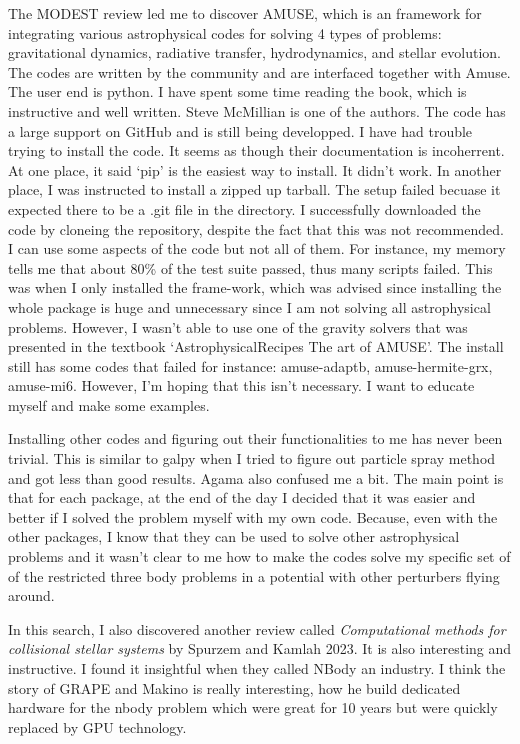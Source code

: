    The MODEST review led me to discover AMUSE, which is an framework for integrating various astrophysical codes for solving 4 types of problems: gravitational dynamics, radiative transfer, hydrodynamics, and stellar evolution. The codes are written by the community and are interfaced together with Amuse. The user end is python. I have spent some time reading the book, which is instructive and well written. Steve McMillian is one of the authors. The code has a large support on GitHub and is still being developped. I have had trouble trying to install the code. It seems as though their documentation is incoherrent. At one place, it said `pip' is the easiest way to install. It didn't work. In another place, I was instructed to install a zipped up tarball. The setup failed becuase it expected there to be a .git file in the directory. I successfully downloaded the code by cloneing the repository, despite the fact that this was not recommended. I can use some aspects of the code but not all of them. For instance, my memory tells me that about 80\% of the test suite passed, thus many scripts failed. This was when I only installed the frame-work, which was advised since installing the whole package is huge and unnecessary since I am not solving all astrophysical problems. However, I wasn't able to use one of the gravity solvers that was presented in the textbook `AstrophysicalRecipes The art of AMUSE'. The install still has some codes that failed for instance: amuse-adaptb, amuse-hermite-grx, amuse-mi6. However, I'm hoping that this isn't necessary. I want to educate myself and make some examples. 

    Installing other codes and figuring out their functionalities to me has never been trivial. This is similar to galpy when I tried to figure out particle spray method and got less than good results. Agama also confused me a bit. The main point is that for each package, at the end of the day I decided that it was easier and better if I solved the problem myself with my own code. Because, even with the other packages, I know that they can be used to solve other astrophysical problems and it wasn't clear to me how to make the codes solve my specific set of of the restricted three body problems in a potential with other perturbers flying around. 

    In this search, I also discovered another review called \textit{Computational methods for collisional stellar systems} by Spurzem and Kamlah 2023. It is also interesting and instructive. I found it insightful when they called NBody an industry. I think the story of GRAPE and Makino is really interesting, how he build dedicated hardware for the nbody problem which were great for 10 years but were quickly replaced by GPU technology. 








